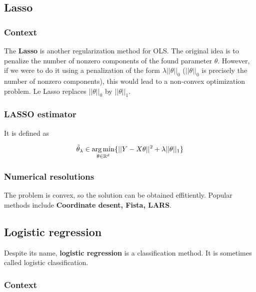 \documentclass[
10pt, %
a4paper, %
oneside, %
headinclude,footinclude, %
BCOR5mm, %
]{scrartcl}
\begin{document}
\subsection{\large\color{MidnightBlue}Lasso}

\subsubsection{\large\color{Periwinkle}Context}

The \textbf{{Lasso}}  is another regularization method for OLS. The original idea is to penalize the number of nonzero components of the found parameter $\theta$. However, if we were to do it using a penalization of the form $\lambda||\theta||_0$ ($||\theta||_0$ is precisely the number of nonzero components), this would lead to a non-convex optimization problem. Le Lasso replaces $||\theta||_0$ by $ ||\theta||_1$.

\subsubsection{\large\color{Periwinkle}LASSO estimator}

It is defined as

\begin{equation*}
    \tilde{\theta}_{\lambda}\in \operatorname*{arg\,min}_{\theta\in \mathbb{R}^d}\{||Y-X\theta||^2+\lambda ||\theta||_1\}
\end{equation*}

\subsubsection{\large\color{Periwinkle}Numerical resolutions}

The problem is convex, so the solution can be obtained effitiently. Popular methods include \textbf{{Coordinate desent, Fista, LARS}}.

\subsection{\large\color{MidnightBlue}Logistic regression}

Despite its name, \textbf{{logistic regression}} is a classification method. It
is sometimes called logistic classification.

\subsubsection{\large\color{Periwinkle}Context}
\end{document}
